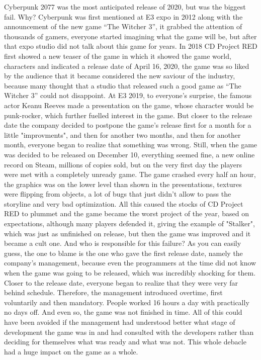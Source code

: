 \documentclass[10pt,twoside,english,a4paper]{article}
\begin{document}
	Cyberpunk 2077 was the most anticipated release of 2020, but was the biggest fail. Why? Cyberpunk was first mentioned at E3 expo in 2012 along with the announcement of the new game “The Witcher 3”, it grabbed the attention of thousands of gamers, everyone started imagining what the game will be, but after that expo studio did not talk about this game for years. In 2018 CD Project RED first showed a new teaser of the game in which it showed the game world, characters and indicated a release date of April 16, 2020, the game was so liked by the audience that it became considered the new saviour of the industry, because many thought that a studio that released such a good game as “The Witcher 3” could not disappoint. At E3 2019, to everyone's surprise, the famous actor Keanu Reeves made a presentation on the game, whose character would be punk-rocker, which further fuelled interest in the game. But closer to the release date the company decided to postpone the game's release first for a month for a little "improvments", and then for another two months, and then for another month, everyone began to realize that something was wrong. Still, when the game was decided to be released on December 10, everything seemed fine, a new online record on Steam, millions of copies sold, but on the very first day the players were met with a completely unready game. The game crashed every half an hour, the graphics was on the lower level than shown in the presentations, textures were flipping from objects, a lot of bugs that just didn't allow to pass the storyline and very bad optimization. All this caused the stocks of CD Project RED to plummet and the game became the worst project of the year, based on expectations, although many players defended it, giving the example of "Stalker", which was just as unfinished on release, but then the game was improved and it became a cult one.
And who is responsible for this failure? As you can easily guess, the one to blame is the one who gave the first release date, namely the company's management, because even the programmers at the time did not know when the game was going to be released, which was incredibly shocking for them. Closer to the release date, everyone began to realize that they were very far behind schedule. Therefore, the management introduced overtime, first voluntarily and then mandatory. People worked 16 hours a day with practically no days off. And even so, the game was not finished in time.  All of this could have been avoided if the management had understood better what stage of development the game was in and had consulted with the developers rather than deciding for themselves what was ready and what was not. This whole debacle had a huge impact on the game as a whole.
\cite {RePEc:hal:journl:hal-03633678}
\end{document}
